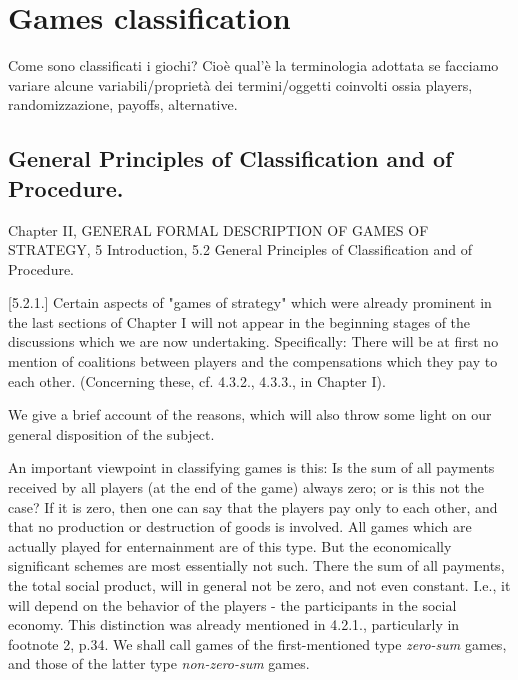 \chapter{Games classification}
Come sono classificati i giochi? Cio\`e qual'\`e la terminologia adottata se facciamo variare alcune variabili/propriet\`a dei termini/oggetti coinvolti ossia players, randomizzazione, payoffs, alternative.

\section{General Principles of Classification and of Procedure. \cite{vonNeumann1944}}
Chapter II, GENERAL FORMAL DESCRIPTION OF GAMES OF STRATEGY, 5 Introduction, 5.2 General Principles of Classification and of Procedure.

[5.2.1.] Certain aspects of "games of strategy" which were already prominent in the last sections of Chapter I will not appear in the beginning stages of the discussions which we are now undertaking. Specifically: There will be at first no mention of coalitions between players and the compensations which they pay to each other. (Concerning these, cf. 4.3.2., 4.3.3., in Chapter I).


We give a brief account of the reasons, which will also throw some light on our general disposition of the subject.

An important viewpoint in classifying games is this: Is the sum of all payments received by all players (at the end of the game) always zero; or is this not the case? If it is zero, then one can say that the players pay only to each other, and that no production or destruction of goods is involved. All games which are actually played for enternainment are of this type. But the economically significant schemes are most essentially not such. There the sum of all payments, the total social product, will in general not be zero, and not even constant. I.e., it will depend on the behavior of the players - the participants in the social economy. This distinction was already mentioned in 4.2.1., particularly in footnote 2, p.34. We shall call games of the first-mentioned type \emph{zero-sum} games, and those of the latter type \emph{non-zero-sum} games.

